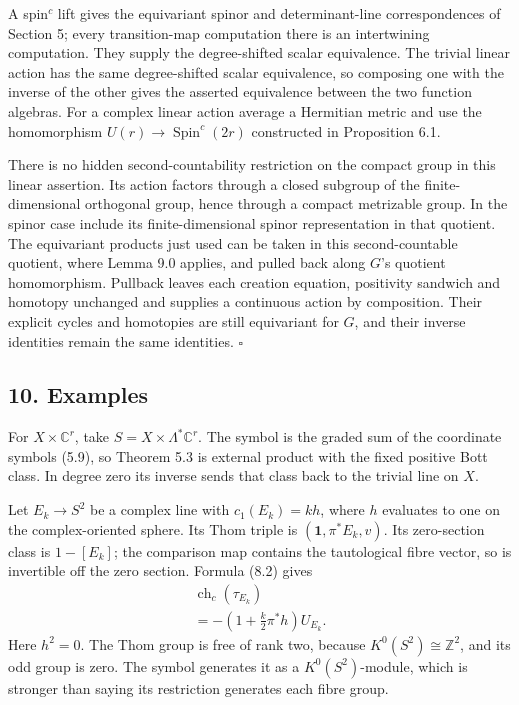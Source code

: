 \documentclass[
  11pt,
]{article}
\begin{document}
A spin\(^{c}\) lift gives the equivariant spinor and determinant-line
correspondences of Section 5; every transition-map computation there is
an intertwining computation. They supply the degree-shifted scalar
equivalence. The trivial linear action has the same degree-shifted
scalar equivalence, so composing one with the inverse of the other gives
the asserted equivalence between the two function algebras. For a
complex linear action average a Hermitian metric and use the
homomorphism \(U(r)\to\operatorname{Spin}^{c}(2r)\) constructed in
Proposition 6.1.

There is no hidden second-countability restriction on the compact group
in this linear assertion. Its action factors through a closed subgroup
of the finite-dimensional orthogonal group, hence through a compact
metrizable group. In the spinor case include its finite-dimensional
spinor representation in that quotient. The equivariant products just
used can be taken in this second-countable quotient, where Lemma 9.0
applies, and pulled back along \(G\)'s quotient homomorphism. Pullback
leaves each creation equation, positivity sandwich and homotopy
unchanged and supplies a continuous action by composition. Their
explicit cycles and homotopies are still equivariant for \(G\), and
their inverse identities remain the same identities. \(\square\)

\subsection{10. Examples}\label{examples}

For \(X\times\mathbb C^r\), take \(S=X\times\Lambda^*\mathbb C^r\). The
symbol is the graded sum of the coordinate symbols (5.9), so Theorem 5.3
is external product with the fixed positive Bott class. In degree zero
its inverse sends that class back to the trivial line on \(X\).

Let \(E_k\to S^2\) be a complex line with \(c_1(E_k)=k h\), where \(h\)
evaluates to one on the complex-oriented sphere. Its Thom triple is
\((\mathbf1,\pi^*E_k,v)\). Its zero-section class is \(1-[E_k]\); the
comparison map contains the tautological fibre vector, so is invertible
off the zero section. Formula (8.2) gives \[
\begin{gathered}
\operatorname{ch}_c(\tau_{E_k})\\
 =-\left(1+\frac{k}{2}\pi^*h\right)U_{E_k}.
\end{gathered}
\tag{10.1}
\] Here \(h^2=0\). The Thom group is free of rank two, because
\(K^0(S^2)\cong\mathbb Z^2\), and its odd group is zero. The symbol
generates it as a \(K^0(S^2)\)-module, which is stronger than saying its
restriction generates each fibre group.
\end{document}
